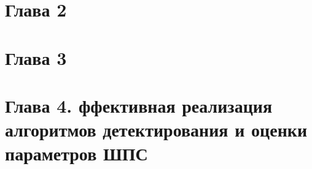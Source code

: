 

%
\tableofcontents %
\newpage










\section{Глава 2}




\section{Глава 3}



\section{Глава 4. ффективная реализация алгоритмов детектирования и оценки параметров ШПС}



